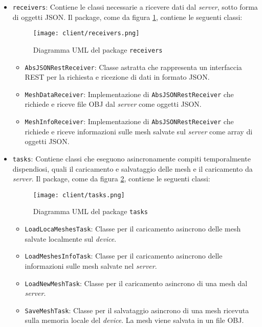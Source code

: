 \begin{itemize}
\item\texttt{receivers}: Contiene le classi necessarie a ricevere dati dal \emph{server}, sotto forma di oggetti JSON. Il package, come da figura \ref{fig:receivers}, contiene le seguenti classi:
\begin{figure}[!h] 
    \centering 
    \texttt{[image: client/receivers.png]} 
    \caption{Diagramma UML del package \texttt{receivers}}
   \label{fig:receivers}
\end{figure}
\begin{itemize}
	\item\texttt{AbsJSONRestReceiver}: Classe astratta che rappresenta un interfaccia REST per la richiesta e ricezione di dati in formato JSON.
	\item\texttt{MeshDataReceiver}: Implementazione di \texttt{AbsJSONRestReceiver} che richiede e riceve file OBJ dal \emph{server} come oggetti JSON.
	\item\texttt{MeshInfoReceiver}: Implementazione di \texttt{AbsJSONRestReceiver} che richiede e riceve informazioni sulle mesh salvate sul \emph{server} come array di oggetti JSON.
	\end{itemize}
\item\texttt{tasks}: Contiene classi che eseguono asincronamente compiti temporalmente dispendiosi, quali il caricamento e salvataggio delle mesh e il caricamento da \emph{server}. Il package, come da figura \ref{fig:tasks}, contiene le seguenti classi:
\begin{figure}[!h] 
    \centering 
    \texttt{[image: client/tasks.png]} 
    \caption{Diagramma UML del package \texttt{tasks}}
   \label{fig:tasks}
\end{figure}
	\begin{itemize}
	\item\texttt{LoadLocaMeshesTask}: Classe per il caricamento asincrono delle mesh salvate localmente sul \emph{device}.
	\item\texttt{LoadMeshesInfoTask}: Classe per il caricamento asincrono delle informazioni sulle mesh salvate nel \emph{server}. 
	\item\texttt{LoadNewMeshTask}: Classe per il caricamento asincrono di una mesh dal \emph{server}.
	\item\texttt{SaveMeshTask}: Classe per il salvataggio asincrono di una mesh ricevuta sulla memoria locale del \emph{device}. La mesh viene salvata in un file OBJ.
	\end{itemize}

\end{itemize}
